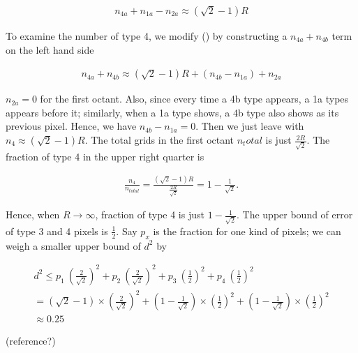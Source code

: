 \documentclass[letterpaper]{article}
\numberwithin{equation}{section} %
\numberwithin{figure}{section} %
\numberwithin{table}{section} %
\begin{document}
\begin{align} 
n_{4a}+n_{1a}-n_{2a} \approx (\sqrt{2}-1)R
\end{align}

\noindent
To examine the number of type 4, we modify () by constructing a $n_{4a}+n_{4b}$ term on the left hand side

\begin{align} 
n_{4a}+n_{4b} \approx (\sqrt{2}-1)R+(n_{4b}-n_{1a})+n_{2a}
\end{align}

\noindent
$n_{2a}=0$ for the first octant. Also, since every time a 4b type appears, a 1a types appears before it; similarly, when a 1a type shows, a 4b type also shows as its previous pixel. Hence, we have $n_{4b}-n_{1a}=0$. Then we just leave with $n_{4} \approx (\sqrt{2}-1)R$. The total grids in the first octant $n_total$ is just $\frac{2R}{\sqrt{2}}$. The fraction of type 4 in the upper right quarter is

\begin{align} 
\frac{n_{4}}{n_{total}} = \frac{(\sqrt{2}-1)R}{\frac{2R}{\sqrt{2}}} = 1-\frac{1}{\sqrt{2}}.
\end{align}

\noindent
Hence, when $R \rightarrow \infty$, fraction of type 4 is just $1-\frac{1}{\sqrt{2}}$. The upper bound of error of type 3 and 4 pixels is $\frac{1}{2}$. Say $p_x$ is the fraction for one kind of pixels; we can weigh a smaller upper bound of $d^2$ by 

\begin{align} 
d^2 \leq p_1 \ (\frac{2}{\sqrt{2}})^2 + p_2 \ (\frac{2}{\sqrt{2}})^2 + p_3 \ (\frac{1}{2})^2 + p_4 \ (\frac{1}{2})^2 \\
= (\sqrt{2}-1) \times (\frac{2}{\sqrt{2}})^2 + (1-\frac{1}{\sqrt{2}}) \times (\frac{1}{2})^2 + (1-\frac{1}{\sqrt{2}}) \times (\frac{1}{2})^2 \\
\approx 0.25
\end{align}

(reference?)
\end{document}
